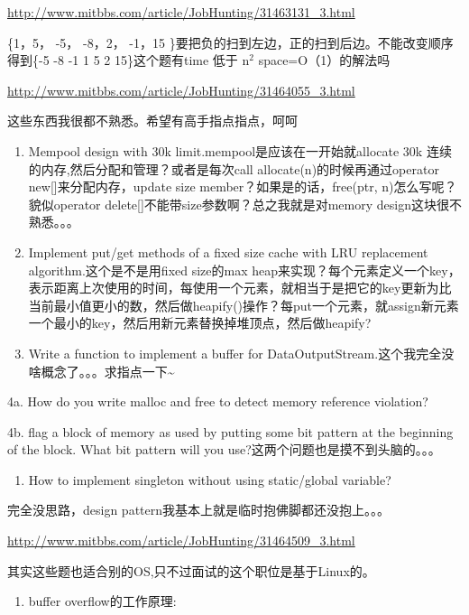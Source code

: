 \documentclass[12pt]{book}
\begin{document}
\url{http://www.mitbbs.com/article/JobHunting/31463131_3.html}

\{1，5， -5， -8，2，  -1，15 \}要把负的扫到左边，正的扫到后边。不能改变顺序得到\{-5 -8 -1 1 5 2 15\}这个题有time 低于 n$^{\text{2}}$ space=O（1）的解法吗

\url{http://www.mitbbs.com/article/JobHunting/31464055_3.html}

这些东西我很都不熟悉。希望有高手指点指点，呵呵

\begin{enumerate}
\item Mempool design with 30k limit.mempool是应该在一开始就allocate 30k 连续的内存,然后分配和管理？或者是每次call allocate(n)的时候再通过operator new[]来分配内存，update size member？如果是的话，free(ptr, n)怎么写呢？貌似operator delete[]不能带size参数啊？总之我就是对memory design这块很不熟悉。。。

\item Implement put/get methods of a fixed size cache with LRU replacement algorithm.这个是不是用fixed size的max heap来实现？每个元素定义一个key，表示距离上次使用的时间，每使用一个元素，就相当于是把它的key更新为比当前最小值更小的数，然后做heapify()操作？每put一个元素，就assign新元素一个最小的key，然后用新元素替换掉堆顶点，然后做heapify?

\item Write a function to implement a buffer for DataOutputStream.这个我完全没啥概念了。。。求指点一下\textasciitilde{}
\end{enumerate}

4a. How do you write malloc and free to detect memory reference violation?

4b. flag a block of memory as used by putting some bit pattern at the beginning of the block. What bit pattern will you use?这两个问题也是摸不到头脑的。。。

\begin{enumerate}
\item How to implement singleton without using static/global variable?
\end{enumerate}

完全没思路，design pattern我基本上就是临时抱佛脚都还没抱上。。。

\url{http://www.mitbbs.com/article/JobHunting/31464509_3.html}

其实这些题也适合别的OS,只不过面试的这个职位是基于Linux的。

\begin{enumerate}
\item buffer overflow的工作原理:
\end{enumerate}
\end{document}
